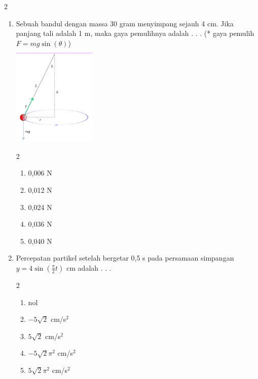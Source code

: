 \documentclass[10pt,a4paper]{extarticle}
\newcommand{\pilgani}[1]{                            \vspace{-0.3cm}\begin{multicols}{2}
 \begin{enumerate}[label=\Alph*., itemsep=0pt,topsep=0pt,leftmargin=*,align=Center]#1                     \end{enumerate}
 \phantom{ini cuma sapi, wedus, dan ayam}
 \end{multicols}}
\begin{document}
\begin{multicols*}{2}
\begin{enumerate}
   \item Sebuah bandul dengan massa 30 gram menyimpang sejauh 4 cm. Jika panjang tali adalah 1 m, maka gaya pemulihnya adalah . . . (* gaya pemulih $F=mg \sin (\theta)$)\\ 
\includegraphics[width=4cm]{pic/pendulum} 
\pilgani{ \item 0,006 N
   \item 0,012 N
   \item 0,024 N
   \item 0,036 N
   \item 0,040 N
   }
   \vspace{2cm}

\item Percepatan partikel setelah bergetar 0,5 s pada persamaan simpangan $y = 4 \sin (\frac{\pi}{2}t)$ cm  adalah . . .
\pilgani{
   \item nol
   \item $-5\sqrt{2}$ cm/s$^2$
   \item $5\sqrt{2}$ cm/s$^2$
   \item $-5\sqrt{2}\pi^2$ cm/s$^2$
   \item $5\sqrt{2}\pi^2$ cm/s$^2$
}
\end{enumerate}
\end{multicols*}
\end{document}

